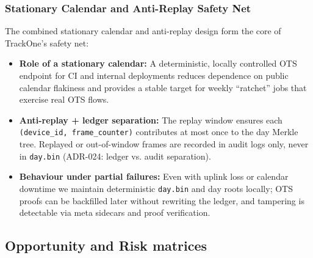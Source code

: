 \subsubsection{Stationary Calendar and Anti-Replay Safety Net}
The combined stationary calendar and anti-replay design form the core of TrackOne's safety net:
\begin{itemize}[nosep]
  \item \textbf{Role of a stationary calendar:} A deterministic, locally controlled \ac{OTS} endpoint for \ac{CI} and internal deployments reduces dependence on public calendar flakiness and provides a stable target for weekly ``ratchet'' jobs that exercise real \ac{OTS} flows.
  \item \textbf{Anti-replay + ledger separation:} The replay window ensures each \texttt{(device\_id, frame\_counter)} contributes at most once to the day Merkle tree.
  Replayed or out-of-window frames are recorded in audit logs only, never in \texttt{day.bin} (ADR-024: ledger vs. audit separation).
  \item \textbf{Behaviour under partial failures:} Even with uplink loss or calendar downtime we maintain deterministic \texttt{day.bin} and day roots locally; \ac{OTS} proofs can be backfilled later without rewriting the ledger, and tampering is detectable via meta sidecars and proof verification.
\end{itemize}

\subsection{Opportunity and Risk matrices}

